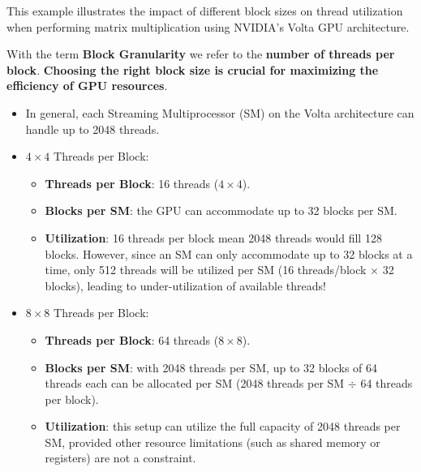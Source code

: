 \begin{examplebox}\label{examplebox: Matrix Multiplication on Volta Architecture}
    This example illustrates the impact of different block sizes on thread utilization when performing matrix multiplication using NVIDIA's Volta GPU architecture.

    With the term \textbf{Block Granularity} we refer to the \textbf{number of threads per block}. \textbf{Choosing the right block size is crucial for maximizing the efficiency of GPU resources}.

    \begin{itemize}
        \item In general, each Streaming Multiprocessor (SM) on the Volta architecture can handle up to 2048 threads.
        \item $4 \times 4$ Threads per Block:
        \begin{itemize}
            \item \textbf{Threads per Block}: 16 threads ($4 \times 4$).
            \item \textbf{Blocks per SM}: the GPU can accommodate up to 32 blocks per SM.
            \item \textbf{Utilization}: 16 threads per block mean 2048 threads would fill 128 blocks. However, since an SM can only accommodate up to 32 blocks at a time, only 512 threads will be utilized per SM (16 threads/block $\times$ 32 blocks), leading to under-utilization of available threads!
        \end{itemize}

        \item $8 \times 8$ Threads per Block:
        \begin{itemize}
            \item \textbf{Threads per Block}: 64 threads ($8 \times 8$).
            \item \textbf{Blocks per SM}: with 2048 threads per SM, up to 32 blocks of 64 threads each can be allocated per SM (2048 threads per SM $\div$ 64 threads per block).
            \item \textbf{Utilization}: this setup can utilize the full capacity of 2048 threads per SM, provided other resource limitations (such as shared memory or registers) are not a constraint.
        \end{itemize}


\end{itemize}
\end{examplebox}
